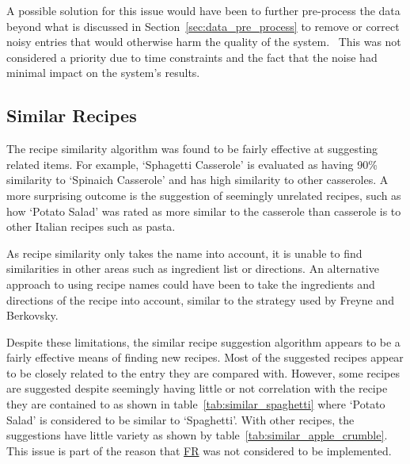 A possible solution for this issue would have been to further pre-process the data beyond what is
discussed in Section~\ref{sec:data_pre_process} to remove or correct noisy entries that would otherwise
harm the quality of the system.~\cite{garcia_big_2016} This was not considered a priority due to time
constraints and the fact that the noise had minimal impact on the system's results.

\subsection{Similar Recipes}

The recipe similarity algorithm was found to be fairly effective at suggesting related items.
For example, \enquote*{Sphagetti Casserole} is evaluated as having 90\% similarity to
\enquote*{Spinaich Casserole} and has high similarity to other casseroles. A more surprising
outcome is the suggestion of seemingly unrelated recipes, such as how \enquote*{Potato Salad}
was rated as more similar to the casserole than casserole is to other Italian recipes such as
pasta.

As recipe similarity only takes the name into account, it is unable to find similarities
in other areas such as ingredient list or directions. An alternative approach to using
recipe names could have been to take the ingredients and directions of the recipe into account,
similar to the strategy used by Freyne and Berkovsky.~\cite{freyne_intelligent_2010}

Despite these limitations, the similar recipe suggestion algorithm appears to be a fairly effective
means of finding new recipes. Most of the suggested recipes appear to be closely related to the entry they are
compared with. However, some recipes are suggested despite seemingly having little or not correlation with the
recipe they are contained to as shown in table~\ref{tab:similar_spaghetti} where \enquote*{Potato Salad} is considered
to be similar to \enquote*{Spaghetti}. With other recipes, the suggestions have little variety as shown by
table~\ref{tab:similar_apple_crumble}. This issue is part of the reason that
\hyperref[req:too_similar]{FR} was not considered to be implemented.

